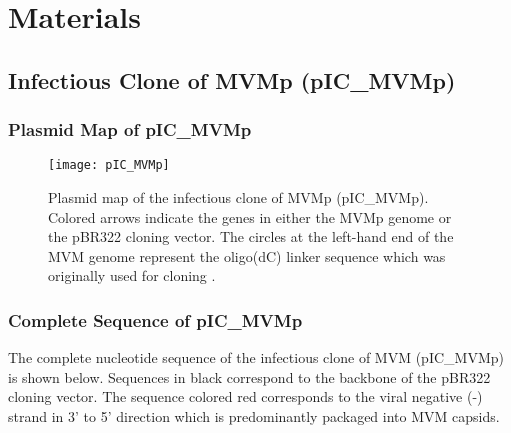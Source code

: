 
\chapter{Materials} %

\label{Materials} %


\section{Infectious Clone of MVMp (pIC\_MVMp)}
\label{IC}


\subsection{Plasmid Map of pIC\_MVMp}

\begin{figure}[h] 
\begin{center}
\texttt{[image: pIC\_MVMp]} \\[0.5cm]
\caption[Plasmid Map of the Infectious Clone of MVMp]{Plasmid map of the infectious clone of MVMp (pIC\_MVMp). Colored arrows indicate the genes in either the MVMp genome or the pBR322 cloning vector. The circles at the left-hand end of the MVM genome represent the oligo(dC) linker sequence which was originally used for cloning \cite{pmid6345805}.}
\label{pIC}
\end{center}
\end{figure}

\newpage

\subsection{Complete Sequence of pIC\_MVMp}
\label{sequence}

\raggedright
The complete nucleotide sequence of the infectious clone of MVM (pIC\_MVMp) is shown below. Sequences in black correspond to the backbone of the pBR322 cloning vector. The sequence colored red corresponds to the viral negative (-) strand in 3' to 5' direction which is predominantly packaged into MVM capsids.  


